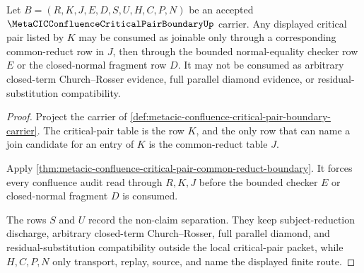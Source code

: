 \begin{theorem}
\label{thm:metacic-confluence-critical-pair-local-join}
Let $B=(R,K,J,E,D,S,U,H,C,P,N)$ be an accepted $\MetaCICConfluenceCriticalPairBoundaryUp$ carrier. Any displayed critical pair listed by $K$ may be consumed as joinable only through a corresponding common-reduct row in $J$, then through the bounded normal-equality checker row $E$ or the closed-normal fragment row $D$. It may not be consumed as arbitrary closed-term Church--Rosser evidence, full parallel diamond evidence, or residual-substitution compatibility.
\end{theorem}
\begin{proof}
Project the carrier of \autoref{def:metacic-confluence-critical-pair-boundary-carrier}. The critical-pair table is the row $K$, and the only row that can name a join candidate for an entry of $K$ is the common-reduct table $J$.

Apply \autoref{thm:metacic-confluence-critical-pair-common-reduct-boundary}. It forces every confluence audit read through $R,K,J$ before the bounded checker $E$ or closed-normal fragment $D$ is consumed.

The rows $S$ and $U$ record the non-claim separation. They keep subject-reduction discharge, arbitrary closed-term Church--Rosser, full parallel diamond, and residual-substitution compatibility outside the local critical-pair packet, while $H,C,P,N$ only transport, replay, source, and name the displayed finite route.
\end{proof}

